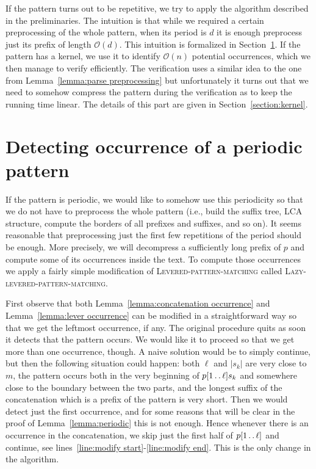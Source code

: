 \documentclass[runningheads]{llncs}
\newcommand{\twodots}{\mathinner{\ldotp\ldotp}}
\newcommand{\proc}[1]{\textnormal{\scshape#1}}
\begin{document}
If the pattern turns out to be repetitive, we try to apply the algorithm described in the preliminaries. The intuition is that while we required a certain preprocessing of the whole pattern, when its period is $d$ it is enough preprocess just its prefix of length $\mathcal{O}(d)$. This intuition is formalized in Section~\ref{section:periodic}. If the pattern has a kernel, we use it to identify $\mathcal{O}(n)$ potential occurrences, which we then manage to verify efficiently. The verification uses a similar idea to the one from Lemma~\ref{lemma:parse preprocessing} but unfortunately it turns out
that we need to somehow compress the pattern during the verification as to keep the running time linear. The details of this part are given in Section~\ref{section:kernel}.

\section{Detecting occurrence of a periodic pattern}
\label{section:periodic}

If the pattern is periodic, we would like to somehow use this periodicity so that we do not have to preprocess the whole pattern (i.e., build the suffix tree, LCA structure, compute the borders of all prefixes and suffixes, and so on). It seems reasonable that preprocessing just the first few repetitions of the period should be enough. More precisely, we will decompress a sufficiently long prefix of $p$ and compute some of its occurrences
inside the text. To compute those occurrences we apply a fairly simple modification of \proc{Levered-pattern-matching} called
\proc{Lazy-levered-pattern-matching}. 

First observe that both Lemma~\ref{lemma:concatenation occurrence} and Lemma~\ref{lemma:lever occurrence} can be modified in a straightforward way so that we get the leftmost occurrence, if any. The original procedure quits as soon it detects that the pattern occurs. We would like it to proceed
so that we get more than one occurrence, though. A naive solution would be to simply continue, but then the following situation could happen:
both $\ell$ and $|s_{k}|$ are very close to $m$, the pattern occurs both in the very beginning of $p[1\twodots\ell]s_{k}$ and somewhere close to the boundary between the two parts, and the longest suffix of the concatenation which is a prefix of the pattern is very short. Then we would detect just the first occurrence, and for some reasons that will be clear in the proof of Lemma~\ref{lemma:periodic} this is not enough. Hence whenever there is an occurrence in the concatenation, we skip just the first half of $p[1\twodots\ell]$ and continue, see lines~\ref{line:modify start}-\ref{line:modify end}. This is the only change in the algorithm.
\end{document}
